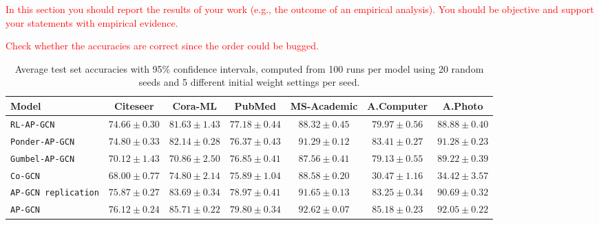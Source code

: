 \documentclass{gdl}
\begin{document}
\textcolor{red}{In this section you should report the results of your work (e.g., the outcome of an empirical analysis). You should be objective and support your statements with empirical evidence.}

\textcolor{red}{Check whether the accuracies are correct since the order could be bugged.}
\begin{table}[h]
    \small\sf\centering
    \caption{Average test set accuracies with 95\% confidence intervals, computed from 100 runs per model using 20 random seeds and 5 different initial weight settings per seed.}
    \begin{tabular}{l c c c c c c}
        \toprule
        Model & Citeseer & Cora-ML & PubMed & MS-Academic & A.Computer & A.Photo\\
        \midrule
        \texttt{RL-AP-GCN} &$74.66 \pm 0.30$&$81.63 \pm 1.43$&$77.18 \pm 0.44$&$88.32 \pm 0.45$&$79.97 \pm 0.56$&$88.88 \pm 0.40$   \\
        \texttt{Ponder-AP-GCN} &$74.80 \pm 0.33$&$82.14 \pm 0.28$&$76.37 \pm 0.43$&$91.29 \pm 0.12$&$83.41 \pm 0.27$&$91.28 \pm 0.23$  \\
        \texttt{Gumbel-AP-GCN} &$70.12 \pm 1.43$&$70.86 \pm 2.50$&$76.85 \pm 0.41$&$87.56 \pm 0.41$&$79.13 \pm 0.55$&$89.22 \pm 0.39$  \\
        \texttt{Co-GCN} &$68.00 \pm 0.77$&$74.80 \pm 2.14$&$75.89 \pm 1.04$&$88.58 \pm 0.20$&$30.47 \pm 1.16$&$34.42 \pm 3.57$  \\
        \texttt{AP-GCN replication} &$75.87 \pm 0.27$&$83.69 \pm 0.34$&$78.97 \pm 0.41$&$91.65 \pm 0.13$&$83.25 \pm 0.34$&$90.69 \pm 0.32$        \\
        \midrule
        \texttt{AP-GCN} & $76.12 \pm 0.24$ & $85.71 \pm 0.22$ & $79.80 \pm 0.34$ & $92.62 \pm 0.07$ & $85.18 \pm 0.23$ & $92.05 \pm 0.22$\\
        \bottomrule
    \end{tabular}
    \label{tab:accuracy}
\end{table}
\end{document}
